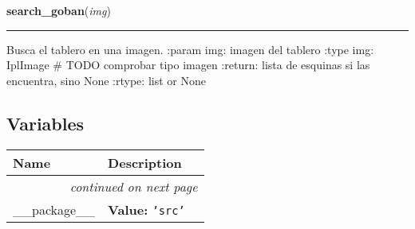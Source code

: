     \label{src:search_goban:search_goban}

    \vspace{0.5ex}

\hspace{.8\funcindent}\begin{boxedminipage}{\funcwidth}

    \raggedright \textbf{search\_goban}(\textit{img})

    \vspace{-1.5ex}

    \rule{\textwidth}{0.5\fboxrule}
\setlength{\parskip}{2ex}
    Busca el tablero en una imagen. :param img: imagen del tablero :type 
    img: IplImage \# TODO comprobar tipo imagen :return: lista de esquinas 
    si las encuentra, sino None :rtype: list or None

\setlength{\parskip}{1ex}
    \end{boxedminipage}



  \subsection{Variables}

    \vspace{-1cm}
\hspace{\varindent}\begin{longtable}{|p{\varnamewidth}|p{\vardescrwidth}|l}
\cline{1-2}
\cline{1-2} \centering \textbf{Name} & \centering \textbf{Description}& \\
\cline{1-2}
\endhead\cline{1-2}\multicolumn{3}{r}{\small\textit{continued on next page}}\\\endfoot\cline{1-2}
\endlastfoot\raggedright \_\-\_\-p\-a\-c\-k\-a\-g\-e\-\_\-\_\- & \raggedright \textbf{Value:} 
{\tt \texttt{'}\texttt{src}\texttt{'}}&\\
\cline{1-2}
\end{longtable}

